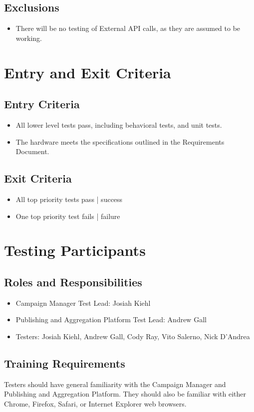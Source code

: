 \documentclass[12pt]{article}
\begin{document}
\subsection{Exclusions}
\begin{itemize}
\item There will be no testing of External API calls, as they are assumed to be working.
\end{itemize}
\section{Entry and Exit Criteria}
\subsection{Entry Criteria}
\begin{itemize}
\item All lower level tests pass, including behavioral tests, and unit tests.
\item The hardware meets the specifications outlined in the Requirements Document.
\end{itemize}
\subsection{Exit Criteria}
\begin{itemize}
  \item All top priority tests pass | success
  \item One top priority test fails | failure
\end{itemize}

\section{Testing Participants}
\subsection{Roles and Responsibilities}
\begin{itemize}
\item Campaign Manager Test Lead: Josiah Kiehl
\item Publishing and Aggregation Platform Test Lead: Andrew Gall
\item Testers: Josiah Kiehl, Andrew Gall, Cody Ray, Vito Salerno, Nick D'Andrea
\end{itemize}

\subsection{Training Requirements}
Testers should have general familiarity with the Campaign Manager and Publishing and Aggregation Platform. They should also be familiar with either Chrome, Firefox, Safari, or Internet Explorer web browsers.
\end{document}
